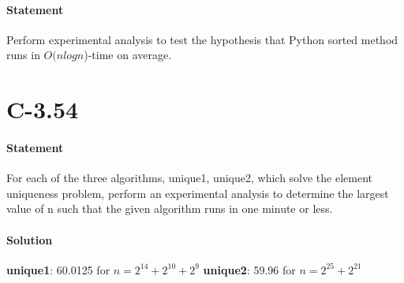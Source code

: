 \documentclass{article}
\begin{document}
\paragraph{Statement}
Perform experimental analysis to test the hypothesis that Python sorted method runs in $O(nlogn$)-time on average. 
\begin{figure}[h]
  \begin{center}
    \end{center}
  \end{figure}
\newpage \section{C-3.54}
\paragraph{Statement}
 For each of the three algorithms, unique1, unique2, which solve the element uniqueness problem, perform an experimental analysis to determine the largest value of n such that the given algorithm runs in one minute or less.
\paragraph{Solution}
    \textbf{unique1}: 60.0125 for $n = 2^14 + 2^10 + 2^9$
    \textbf{unique2}: 59.96 for $n = 2^25 + 2^21$
\end{document}
